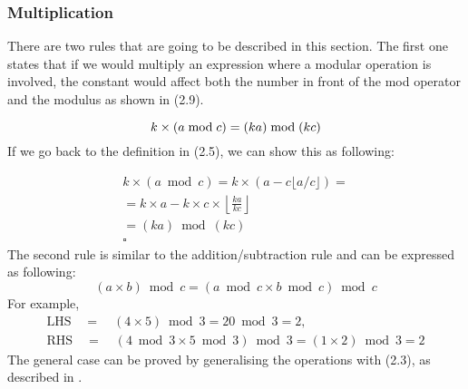 \subsubsection{Multiplication}
There are two rules that are going to be described in this section. The first one states that if we would multiply an expression where a modular operation is involved, the constant would affect both the number in front of  the mod operator and the modulus as shown in (2.9).

\begin{equation}
k \times ( a\bmod c) = (ka) \bmod (kc) \\
\end{equation}
If we go back to the definition in (2.5), we can show this as following:

\begin{eqnarray*}
k \times (a \bmod c) = k \times ( a-c\lfloor a/c \rfloor ) = \\
= k\times a - k \times c \times \left\lfloor \frac{ka}{kc} \right \rfloor \\
= (ka) \bmod (kc) \\
\square
\end{eqnarray*}
The second rule is similar to the addition/subtraction rule and can be expressed as following:
\begin{equation}
(a \times b) \bmod c = (a\bmod c \times b\bmod c) \bmod c
\end{equation}
For example,
\begin{eqnarray*}
\text{LHS} \quad = \quad (4 \times 5) \bmod 3 = 20 \bmod 3 = 2, \\
\text{RHS} \quad=\quad (4 \bmod 3 \times 5 \bmod 3) \bmod 3 = (1 \times 2) \bmod 3 = 2 
\end{eqnarray*}
The general case can be proved by generalising the operations with (2.3), as described in \cite{Khan2}.

